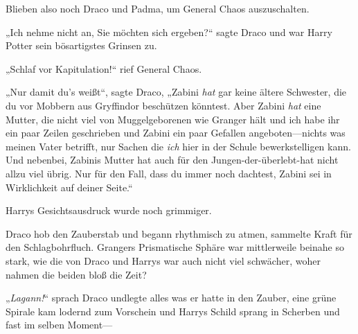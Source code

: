 Blieben also noch Draco und Padma, um General Chaos auszuschalten.

„Ich nehme nicht an, Sie möchten sich ergeben?“ sagte Draco und war Harry Potter sein bösartigstes Grinsen zu.

„Schlaf vor Kapitulation!“ rief General Chaos.

„Nur damit du’s weißt“, sagte Draco, „Zabini \emph{hat} gar keine ältere Schwester, die du vor Mobbern aus Gryffindor beschützen könntest. Aber Zabini \emph{hat} eine Mutter, die nicht viel von Muggelgeborenen wie Granger hält und ich habe ihr ein paar Zeilen geschrieben und Zabini ein paar Gefallen angeboten—nichts was meinen Vater betrifft, nur Sachen die \emph{ich} hier in der Schule bewerkstelligen kann. Und nebenbei, Zabinis Mutter hat auch für den Jungen-der-überlebt-hat nicht allzu viel übrig. Nur für den Fall, dass du immer noch dachtest, Zabini sei in Wirklichkeit auf deiner Seite.“

Harrys Gesichtsausdruck wurde noch grimmiger.

Draco hob den Zauberstab und begann rhythmisch zu atmen, sammelte Kraft für den Schlagbohrfluch. Grangers Prismatische Sphäre war mittlerweile beinahe so stark, wie die von Draco und Harrys war auch nicht viel schwächer, woher nahmen die beiden bloß die Zeit?

„\emph{Lagann!}“ sprach Draco undlegte alles was er hatte in den Zauber, eine grüne Spirale kam lodernd zum Vorschein und Harrys Schild sprang in Scherben und fast im selben Moment—

